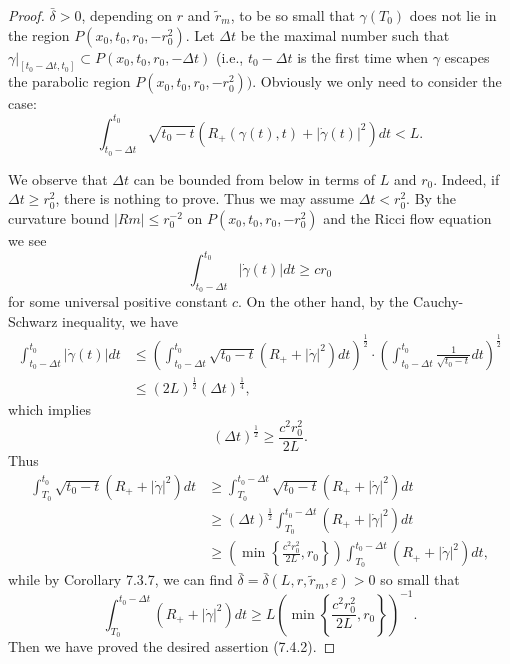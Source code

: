 \begin{proof}
$\bar{\delta}>0$, depending on $r$ and $\widetilde{r}_m$, to be so
small that $\gamma(T_0)$ does not lie in the region
$P(x_0,t_0,r_0,-r^2_0)$. Let $\Delta t$ be the maximal number such
that $\gamma|_{[t_0-\Delta t,t_0]}\subset P(x_0,t_0,r_0,-\Delta
t)$ (i.e., $t_0-\Delta t$ is the first time when $\gamma$ escapes
the parabolic region $P(x_0,t_0,r_0,-r^2_0)).$ Obviously we only
need to consider the case:
$$
\int^{t_0}_{t_0 -\Delta t}\sqrt{t_0 -
t}(R_+(\gamma(t),t)+|\dot{\gamma}(t)|^2)dt<L.
$$

We observe that $\Delta t$ can be bounded from below in terms of
$L$ and $r_0$. Indeed, if $\Delta t \geq r_0^2$, there is nothing
to prove. Thus we may assume $\Delta t<r_0^2$. By the curvature
bound $|Rm|\leq r^{-2}_0$ on $P(x_0,t_0,r_0,-r^2_0)$ and the Ricci
flow equation we see
$$
\int^{t_0}_{t_0-\Delta t}|\dot{\gamma}(t)|dt\geq cr_0
$$
for some universal positive constant $c$. On the other hand, by
the Cauchy-Schwarz inequality, we have
\begin{align*}
\int^{t_0}_{t_0-\Delta t}|\dot{\gamma}(t)|dt & \leq
\left(\int^{t_0}_{t_0-\Delta t}\sqrt{t_0-t}(R_++|
\dot{\gamma}|^2)dt\right)^{\frac{1}{2}} \cdot\left(\int^{t_0}_{t_0-\Delta
t}\frac{1}{\sqrt{t_0-t}}dt\right)^{\frac{1}{2}}\\
&  \leq (2L)^{\frac{1}{2}}(\Delta t)^{\frac{1}{4}},
\end{align*}
which implies \begin{equation}
(\Delta t)^{\frac{1}{2}}\geq\frac{c^2r^2_0}{2L}. %
\end{equation} Thus
\begin{align*}
\int^{t_0}_{T_0}\sqrt{t_0-t}(R_++|\dot{\gamma}|^2)dt& \geq
\int^{t_0-\Delta
t}_{T_0}\sqrt{t_0-t}(R_++|\dot{\gamma}|^2)dt\\
&  \geq (\Delta t)^{\frac{1}{2}}\int^{t_0-\Delta
t}_{T_0}(R_++|\dot{\gamma}|^2)dt\\
&  \geq \left(\min \left\{\frac{c^2r^2_0}{2L},r_0 \right\}\right)
\int^{t_0-\Delta t}_{T_0}(R_++|\dot{\gamma}|^2)dt,
\end{align*}
while by Corollary 7.3.7, we can find
$\bar{\delta}=\bar{\delta}(L,r,\widetilde{r}_m,\varepsilon)>0$ so
small that
$$
\int^{t_0-\Delta t}_{T_0}(R_++|\dot{\gamma}|^2)dt \geq
L\left(\min\left\{\frac{c^2r^2_0}{2L},r_0 \right\}\right)^{-1}.
$$
Then we have proved the desired assertion (7.4.2).
\end{proof}

